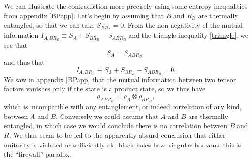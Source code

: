 \documentclass[12pt]{article}
\newcommand{\be}{\begin{equation}}
\newcommand{\ee}{\end{equation}}
\begin{document}
We can illustrate the contradiction more precisely using some entropy inequalities from appendix \ref{BPapp}.  Let's begin by assuming that $B$ and $R_B$ are thermally entangled, so that we can take $S_{BR_B}=0$.  From the non-negativity of the mutual information $I_{A,BR_B}\equiv S_A+S_{BR_B}-S_{ABR_B}$ and the triangle inequality \eqref{triangle}, we see that
\be
S_A=S_{ABR_B},
\ee
and thus that
\be
I_{A,BR_B}\equiv S_A+S_{BR_B}-S_{ABR_B}=0.
\ee
We saw in appendix \ref{BPapp} that the mutual information between two tensor factors vanishes only if the state is a product state, so we thus have
\be
\rho_{ABR_B}=\rho_A\otimes \rho_{BR_B},
\ee
which is incompatible with any entanglement, or indeed correlation of any kind, between $A$ and $B$.  Conversely we could assume that $A$ and $B$ are thermally entangled, in which case we would conclude there is no correlation between $B$ and $R$.  We thus seem to be led to the apparently absurd conclusion that either unitarity is violated or sufficiently old black holes have singular horizons; this is the ``firewall'' paradox.  
\end{document}
